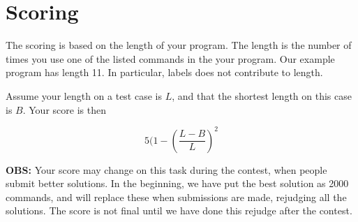 \section*{Scoring}
The scoring is based on the length of your program. The length is the number of times you use one of the listed commands in the your program. Our example program has length 11. In particular, labels does not contribute to length.

Assume your length on a test case is $L$, and that the shortest length on this case is $B$. Your score is then

\[ 5 (1 - (\frac{L - B}{L})^2\]

\textbf{OBS:} Your score may change on this task during the contest, when people submit better solutions. In the beginning, we have put the best solution as 2000 commands, and will replace these when submissions are made, rejudging all the solutions. The score is not final until we have done this rejudge after the contest.
